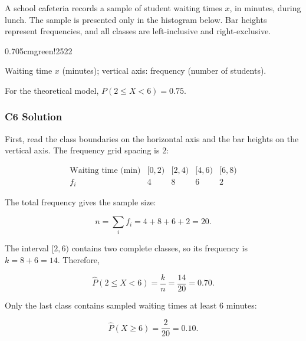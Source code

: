 A school cafeteria records a sample of student waiting times $x$, in minutes,
during lunch. The sample is presented only in the histogram below. Bar heights
represent frequencies, and all classes are left-inclusive and right-exclusive.

    {0.70\textwidth}{5cm}{green!25}{2}{2}

\begin{center}
    Waiting time $x$ (minutes); vertical axis: frequency (number of students).
\end{center}

For the theoretical model, $P(2\leq X<6)=0.75$.


\subsubsection*{C6 Solution}
\label{subsec:c6-only-histogram-solution}

First, read the class boundaries on the horizontal axis and the bar heights
on the vertical axis. The frequency grid spacing is $2$:

\[
\begin{array}{c|cccc}
    \text{Waiting time (min)} & [0,2) & [2,4) & [4,6) & [6,8) \\ \hline
    f_i & 4 & 8 & 6 & 2
\end{array}
\]

The total frequency gives the sample size:

\[
n=\sum_i f_i=4+8+6+2=20.
\]

The interval $[2,6)$ contains two complete classes, so its frequency is
$k=8+6=14$. Therefore,

\[
\widehat P(2\leq X<6)=\frac{k}{n}=\frac{14}{20}=0.70.
\]

Only the last class contains sampled waiting times at least $6$ minutes:

\[
\widehat P(X\geq6)=\frac{2}{20}=0.10.
\]

